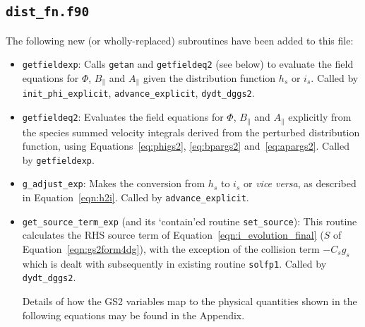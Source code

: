 \documentclass[10pt,a4paper]{article}
\begin{document}
\subsection{\texttt{dist\_fn.f90}}
\label{sec:dist_fn.f90}

The following new (or wholly-replaced) subroutines have been added to this file:

\begin{itemize}

\item \texttt{getfieldexp}: Calls \texttt{getan} and \texttt{getfieldeq2} (see
  below) to evaluate the field equations for $\Phi$, $B_\parallel$ and
  $A_\parallel$ given the distribution function $h_s$ or $i_s$. Called by
  \texttt{init\_phi\_explicit}, \texttt{advance\_explicit}, \texttt{dydt\_dggs2}.

\item \texttt{getfieldeq2}: Evaluates the field equations for $\Phi$,
  $B_\parallel$ and $A_\parallel$ explicitly from the species summed velocity
  integrals derived from the perturbed distribution function, using
  Equations~\ref{eq:phigs2}, \ref{eq:bpargs2} and~\ref{eq:apargs2}. Called by
  \texttt{getfieldexp}.

\item \texttt{g\_adjust\_exp}: Makes the conversion from $h_s$ to $i_s$ or
  \textit{vice versa}, as described in Equation~\ref{eqn:h2i}. Called by
  \texttt{advance\_explicit}.

\item \texttt{get\_source\_term\_exp} (and its `contain'ed routine
  \texttt{set\_source}): This routine calculates the RHS source term of
  Equation~\ref{eqn:i_evolution_final} ($S$ of Equation~\ref{eqn:gs2form4dg}),
  with the exception of the collision term $-C_s g_s$ which is dealt with
  subsequently in existing routine \texttt{solfp1}. Called by
  \texttt{dydt\_dggs2}.

Details of how the GS2 variables map to the physical quantities shown in the
following equations may be found in the Appendix.


\end{itemize}
\end{document}
